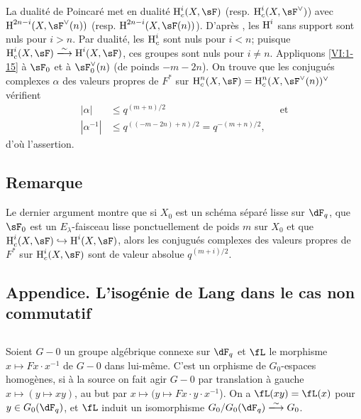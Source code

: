 La dualité de Poincaré met en dualité $\h_c^i(X,\sF)$ (resp. 
$\h_c^i(X,\sF^\vee)$) avec $\h^{2n-i}(X,\sF^\vee(n))$ (resp. 
$\h^{2n-i}(X,\sF(n))$). D'après \cite[XIV 3.2]{sga4}, les $\operatorname{H}^i$ sans support 
sont nuls pour $i>n$. Par dualité, les $\operatorname{H}_c^i$ sont nuls pour $i<n$; puisque 
$\h_c^i(X,\sF) \iso \h^i(X,\sF)$, ces groupes sont nuls pour $i\ne n$. 
Appliquons \ref{VI:1-15} à $\sF_0$ et à $\sF_0^\vee(n)$ (de poinds 
$-m-2n$). On trouve que les conjugués complexes $\alpha$ des valeurs propres 
de $F^\ast$ sur $\h_c^n(X,\sF) = \h_c^n(X,\sF^\vee(n))^\vee$ vérifient 
\begin{align*}
  |\alpha| &\leqslant q^{(m+n)/2} && \text{et} \\
  |\alpha^{-1}| &\leqslant q^{((-m-2n)+n)/2} = q^{-(m+n)/2} \text{,}
\end{align*}
d'où l'assertion. 





\subsection{Remarque}\label{VI:1-21}

Le dernier argument montre que si $X_0$ est un schéma séparé lisse sur 
$\dF_q$, que $\sF_0$ est un $E_\lambda$-faisceau lisse ponctuellement de poids 
$m$ sur $X_0$ et que $\h_c^i(X,\sF) \hookrightarrow \h^i(X,\sF)$, alors les 
conjugués complexes des valeurs propres de $F^\ast$ sur $\h_c^i(X,\sF)$ sont 
de valeur absolue $q^{(m+i)/2}$. 





\subsection*{Appendice. L'isogénie de Lang dans le cas non commutatif}




\subsection{}\label{VI:1-22}

Soient $G-0$ un groupe algébrique connexe sur $\dF_q$ et $\fL$ le morphisme 
$x\mapsto F x\cdot x^{-1}$ de $G-0$ dans lui-même. C'est un orphisme de 
$G_0$-espaces homogènes, si à la source on fait agir $G-0$ par translation 
à gauche $x\mapsto (y\mapsto x y)$, au but par 
$x\mapsto (y\mapsto F x\cdot y\cdot x^{-1}$). On a $\fL(xy) = \fL(x)$ pour 
$y\in G_0(\dF_q)$, et $\fL$ induit un isomorphisme $G_0/G_0(\dF_q)\iso G_0$. 

